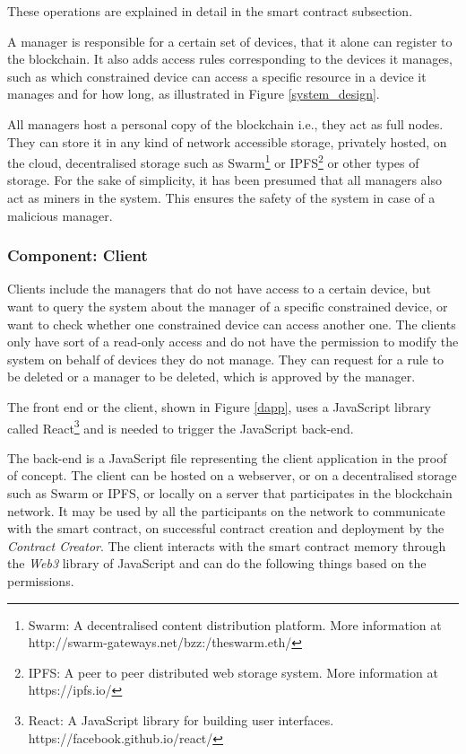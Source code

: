 \documentclass[english]{tktltiki}
\begin{document}
These operations are explained in detail in the smart contract subsection.

A manager is responsible for a certain set of devices, that it alone can register to the blockchain. It also adds access rules corresponding to the devices it manages, such as which constrained device can access a specific resource in a device it manages and for how long, as illustrated in Figure \ref{system_design}.

All managers host a personal copy of the blockchain i.e., they act as full nodes. They can store it in any kind of network accessible storage, privately hosted, on the cloud, decentralised storage such as Swarm\footnote{Swarm: A decentralised content distribution platform. More information at http://swarm-gateways.net/bzz:/theswarm.eth/} or IPFS\footnote{IPFS: A peer to peer distributed web storage system. More information at https://ipfs.io/} or other types of storage. For the sake of simplicity, it has been presumed that all managers also act as miners in the system. This ensures the safety of the system in case of a malicious manager.

\subsubsection{Component: Client}

Clients include the managers that do not have access to a certain device, but want to query the system about the manager of a specific constrained device, or want to check whether one constrained device can access another one. The clients only have sort of a read-only access and do not have the permission to modify the system on behalf of devices they do not manage. They can request for a rule to be deleted or a manager to be deleted, which is approved by the manager.

The front end or the client, shown in Figure \ref{dapp}, uses a JavaScript library called React\footnote{React: A JavaScript library for building user interfaces. https://facebook.github.io/react/} and is needed to trigger the JavaScript back-end.  

The back-end is a JavaScript file representing the client application in the proof of concept. The client can be hosted on a webserver, or on a decentralised storage such as Swarm or IPFS, or locally on a server that participates in the blockchain network. It may be used by all the participants on the network to communicate with the smart contract, on successful contract creation and deployment by the \textit{Contract Creator}. The client interacts with the smart contract memory through the \textit{Web3} library of JavaScript and can do the following things based on the permissions.
\end{document}
